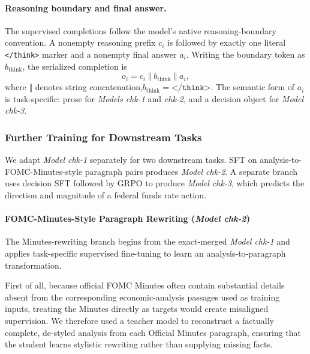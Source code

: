 \paragraph*{Reasoning boundary and final answer.}
The supervised completions follow the model's native reasoning-boundary
convention. A nonempty reasoning prefix $c_i$ is followed by exactly one
literal \texttt{</think>} marker and a nonempty final
answer $a_i$. Writing the boundary token as $b_{\mathrm{think}}$, the
serialized completion is
\begin{equation*}
    o_i=c_i\;\Vert\;b_{\mathrm{think}}\;\Vert\;a_i,
\end{equation*}
where $\Vert$ denotes string concatenation,$b_{\mathrm{think}} = \texttt{</think>} $. The semantic form of $a_i$ is task-specific: prose for \textit{Models chk-1} and \textit{chk-2}, and a decision object for \textit{Model chk-3}. 






\subsubsection*{Further Training for Downstream Tasks}

We adapt \textit{Model chk-1} separately for two downstream tasks. SFT on
analysis-to-FOMC-Minutes-style paragraph pairs produces \textit{Model chk-2}.
A separate branch uses decision SFT followed by GRPO to produce
\textit{Model chk-3}, which
predicts the direction and magnitude of a federal funds rate action.


\paragraph*{FOMC-Minutes-Style Paragraph Rewriting (\textit{Model chk-2})}

The Minutes-rewriting branch begins from the exact-merged \textit{Model chk-1}  and applies task-specific supervised fine-tuning to learn an analysis-to-paragraph transformation. 

First of all, because official FOMC Minutes often contain substantial details absent from the corresponding economic-analysis passages used as training inputs, treating the Minutes directly as targets would create misaligned supervision. We therefore used a teacher model to reconstruct a factually complete, de-styled analysis from each Official Minutes paragraph, ensuring that the student learns stylistic rewriting rather than supplying missing facts.

